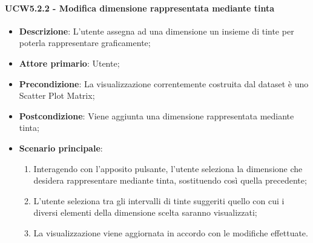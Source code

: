 \paragraph{UCW5.2.2 - Modifica dimensione rappresentata mediante tinta}
\label{par:ucw5.2.2}
\begin{itemize}

    \item \textbf{Descrizione}:     L'utente assegna ad una dimensione un insieme di tinte per poterla rappresentare
                                    graficamente;

    \item \textbf{Attore primario}: Utente;
    \item \textbf{Precondizione}:   La visualizzazione correntemente costruita dal dataset è uno Scatter Plot Matrix;
    \item \textbf{Postcondizione}:  Viene aggiunta una dimensione rappresentata mediante tinta;
    \item \textbf{Scenario principale}:
    \begin{enumerate}

        \item   Interagendo con l'apposito pulsante, l'utente seleziona la dimensione che desidera rappresentare
                mediante tinta, sostituendo così quella precedente;

        \item   L'utente seleziona tra gli intervalli di tinte suggeriti quello con cui i diversi elementi della
                dimensione scelta saranno visualizzati;

        \item   La visualizzazione viene aggiornata in accordo con le modifiche effettuate.
    \end{enumerate}
\end{itemize}

